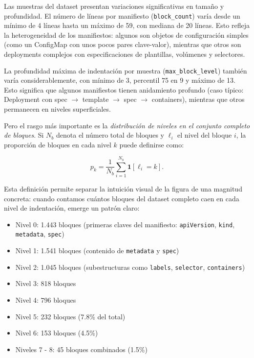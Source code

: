 Las muestras del dataset presentan variaciones significativas en tamaño y profundidad. El número de líneas por manifiesto (\texttt{block\_count}) varía desde un mínimo
de 4 líneas hasta un máximo de 59, con mediana de 20 líneas. Esto refleja la heterogeneidad de los manifiestos: algunos son objetos de configuración simples (como un
ConfigMap con unos pocos pares clave-valor), mientras que otros son deployments complejos con especificaciones de plantillas, volúmenes y selectores.

La profundidad máxima de indentación por muestra (\texttt{max\_block\_level}) también varía considerablemente, con mínimo de 3, percentil 75 en 9 y máximo de 13.
Esto significa que algunos manifiestos tienen anidamiento profundo (caso típico: Deployment con spec \(\rightarrow\) template \(\rightarrow\) spec \(\rightarrow\) containers),
mientras que otros permanecen en niveles superficiales.

Pero el rasgo más importante es la \textit{distribución de niveles en el conjunto completo de bloques}. Si \(N_b\) denota el número total de bloques y \(\ell_i\)
el nivel del bloque \(i\), la proporción de bloques en cada nivel \(k\) puede definirse como:

\[
p_k = \frac{1}{N_b}\sum_{i=1}^{N_b}\mathbf{1}[\ell_i = k].
\]

Esta definición permite separar la intuición visual de la figura de una magnitud concreta: cuando contamos cuántos bloques del dataset completo caen en
cada nivel de indentación, emerge un patrón claro:

\begin{itemize}
\item Nivel 0: 1.443 bloques (primeras claves del manifiesto: \texttt{apiVersion}, \texttt{kind}, \texttt{metadata}, \texttt{spec})
\item Nivel 1: 1.541 bloques (contenido de \texttt{metadata} y \texttt{spec})
\item Nivel 2: 1.045 bloques (subestructuras como \texttt{labels}, \texttt{selector}, \texttt{containers})
\item Nivel 3: 818 bloques
\item Nivel 4: 796 bloques
\item Nivel 5: 232 bloques (7.8\% del total)
\item Nivel 6: 153 bloques (4.5\%)
\item Niveles 7 - 8: 45 bloques combinados (1.5\%)
\end{itemize}

